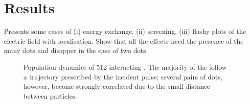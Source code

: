 \section{Results}
Presents some cases of (i) energy exchange, (ii) screening, (iii) flashy plots of the electric field with localisation.
Show that all the effects need the presence of the many dots and disapper in the case of two dots.

\begin{figure}
  
  \caption{\label{fig:population dynamics}Population dynamics of 512 interacting \qds{}.
    The majority of the \qds{} follow a trajectory prescribed by the incident pulse; several pairs of dots, however, become strongly correlated due to the small distance between particles.
  }
\end{figure}
